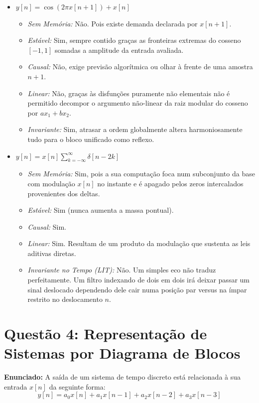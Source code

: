 \documentclass[tcc]{classe_uftex/uftex}
\begin{document}
\begin{itemize}
    \item[\textbf{c)}] $y[n] = \cos(2\pi x[n+1]) + x[n]$
    \begin{itemize}
        \item \textit{Sem Memória:} Não. Pois existe demanda declarada por $x[n+1]$.
        \item \textit{Estável:} Sim, sempre contido graças as fronteiras extremas do cosseno $[-1, 1]$ somadas a amplitude da entrada avaliada.
        \item \textit{Causal:} Não, exige previsão algorítmica ou olhar à frente de uma amostra $n+1$.
        \item \textit{Linear:} Não, graças às disfunções puramente não elementais não é permitido decompor o argumento não-linear da raiz modular do cosseno por $ax_1 + bx_2$.
        \item \textit{Invariante:} Sim, atrasar a ordem globalmente altera harmoniosamente tudo para o bloco unificado como reflexo.
    \end{itemize}

    \item[\textbf{d)}] $y[n] = x[n] \sum_{k=-\infty}^{\infty} \delta[n-2k]$
    \begin{itemize}
        \item \textit{Sem Memória:} Sim, pois a sua computação foca num subconjunto da base com modulação $x[n]$ no instante e é apagado pelos zeros intercalados provenientes dos deltas.
        \item \textit{Estável:} Sim (nunca aumenta a massa pontual).
        \item \textit{Causal:} Sim.
        \item \textit{Linear:} Sim. Resultam de um produto da modulação que sustenta as leis aditivas diretas.
        \item \textit{Invariante no Tempo (LIT):} Não. Um simples eco não traduz perfeitamente. Um filtro indexando de dois em dois irá deixar passar um sinal deslocado dependendo dele cair numa posição par versus na ímpar restrito no deslocamento $n$.
    \end{itemize}
\end{itemize}

\section{Questão 4: Representação de Sistemas por Diagrama de Blocos}

\textbf{Enunciado:} A saída de um sistema de tempo discreto est\'a relacionada \`a sua entrada $x[n]$ da seguinte forma:
\begin{equation*}
    y[n] = a_0 x[n] + a_1 x[n-1] + a_2 x[n-2] + a_3 x[n-3]
\end{equation*}
\end{document}
